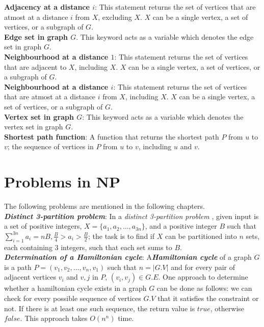 \textbf{Adjacency at a distance {\boldmath$i$}}: This statement returns the set of vertices that are atmost at a distance $i$ from $X$, excluding $X$. $X$ can be a single vertex, a set of vertices, or a subgraph of $G$.\\

\textbf{Edge set in graph {\boldmath$G$}}. This keyword acts as a variable which denotes the edge set in graph $G$.\\

\textbf{Neighbourhood at a distance {\boldmath$1$}}: This statement returns the set of vertices that are adjacent to $X$, including $X$. $X$ can be a single vertex, a set of vertices, or a subgraph of $G$.\\

\textbf{Neighbourhood at a distance {\boldmath$i$}}: This statement returns the set of vertices that are atmost at a distance $i$ from $X$, including $X$. $X$ can be a single vertex, a set of vertices, or a subgraph of $G$.\\

\textbf{Vertex set in graph {\boldmath$G$}}: This keyword acts as a variable which denotes the vertex set in graph $G$.\\

\textbf{Shortest path function}: A function that returns the shortest path $P$ from $u$ to $v$; the sequence of vertices in $P$ from $u$ to $v$, including $u$ and $v$.

\section{Problems in NP}\label{section:problems-in-NP}

The following problems are mentioned in the following chapters.\\

\textbf{\textit{Distinct 3-partition problem}}: In a \textit{distinct 3-partition problem} , given input is a set of positive integers, $X = \{a_1, a_2, . . ., a_{3n}\}$, and a positive integer $B$ such that $\sum_{i=1}^{3n}a_i = nB, \frac{B}{4}>a_i>\frac{B}{2}$; the task is to find if $X$ can be partitioned into $n$ sets, each containing $3$ integers, such that each set sums to $B$.\\

\textbf{\textit{Determination of a Hamiltonian cycle}}: A\textbf{\textit{Hamiltonian cycle}}  of a graph $G$ is a path $P=(v_1,v_2,\dots,v_n,v_1)$ such that $n=|G.V|$ and for every pair of adjacent vertices $v_i$ and $v,j$ in $P$, $(v_i,v_j)\in G.E$. One approach to determine whether a hamiltonian cycle exists in a graph $G$ can be done as follows: we can check for every possible sequence of vertices $G.V$ that it satisfies the constraint or not. If there is at least one such sequence, the return value is $true$, otherwise $false$. This approach takes $O(n^n)$ time.\\

